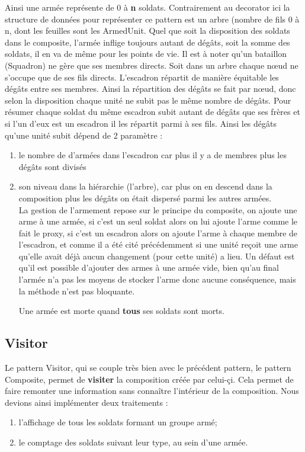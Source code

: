 \documentclass[12pt]{article}
\begin{document}
Ainsi une armée représente de 0 à \textbf{n} soldats.
Contrairement au decorator ici la structure de données pour représenter ce pattern
est un arbre (nombre de fils 0 à n, dont les feuilles sont les ArmedUnit.
Quel que soit la disposition des soldats dans le composite, l'armée inflige 
toujours autant de dégâts, soit la somme des soldats, il en va de même pour les 
points de vie.
Il est à noter qu'un bataillon (Squadron) ne gère que ses membres directs.
Soit dans un arbre chaque nœud ne s'occupe que de ses fils directs.
L'escadron répartit de manière équitable les dégâts entre ses membres.
Ainsi la répartition des dégâts se fait par nœud, donc selon la disposition
chaque unité ne subit pas le même nombre de dégâts.
Pour résumer chaque soldat du même escadron subit autant de dégâts que
ses frères et si l'un d'eux est un escadron il les répartit parmi à ses
fils.
Ainsi les dégâts qu'une unité subit dépend de 2 paramètre :
\begin{enumerate}
\item le nombre de d'armées dans l'escadron car plus il y a de membres plus
les dégâts sont divisés
\item son niveau dans la hiérarchie (l'arbre), car plus on en descend dans la
composition plus les dégâts on était dispersé parmi les autres armées.\\
La gestion de l'armement repose sur le principe du composite, on ajoute une arme
à une armée, si c'est un seul soldat alors on lui ajoute l'arme comme le fait le
proxy, si c'est un escadron alors on ajoute l'arme à chaque membre de l'escadron,
et comme il a été cité précédemment si une unité reçoit une arme qu'elle avait
déjà aucun changement (pour cette unité) a lieu.
Un défaut est qu'il est possible d'ajouter des armes à une armée vide,
bien qu'au final l'armée n'a pas les moyens de stocker l'arme donc aucune 
conséquence, mais la méthode n'est pas bloquante.

Une armée est morte quand \textbf{tous} ses soldats sont morts.
\end{enumerate}
\subsection{Visitor}
Le pattern Visitor, qui se couple très bien avec le précédent pattern, le pattern 
Composite, permet de \textbf{visiter} la composition créée par celui-çi. Cela 
permet de faire remonter une information sans connaître l'intérieur de la 
composition.
Nous devions ainsi implémenter deux traitements :
\begin{enumerate}
 \item l'affichage de tous les soldats formant un groupe armé;
 \item le comptage des soldats suivant leur type, au sein d'une armée.
\end{enumerate}
\end{document}
